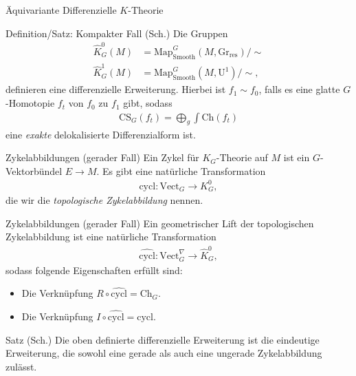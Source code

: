 \documentclass[12pt,utf8,notheorems,compress,t]{beamer}
\renewcommand{\_}{\mathpunct{.}}
\newcommand{\?}{\,{:}\,}
\newcommand{\Ch}{\mathrm{Ch}}
\newcommand{\CS}{\mathrm{CS}}
\newcommand{\grres}{\mathrm{Gr}_{\mathrm{res}}}
\begin{document}
\begin{frame}{Äquivariante Differenzielle $K$-Theorie}
    \begin{block}{Definition/Satz: Kompakter Fall (Sch.)}
        Die Gruppen
        \begin{align*}
            \hat K_G^0(M) &= \textrm{Map}^G_{\mathrm{Smooth}}(M, \grres)/\sim\\
            \hat K_G^{1}(M) &= \textrm{Map}^G_{\mathrm{Smooth}}(M, \mathrm
            U^1)/\sim,
        \end{align*}
        definieren eine differenzielle Erweiterung. Hierbei ist $f_1 \sim f_0$, 
        falls es eine glatte $G$-Homotopie $f_t$ von $f_0$ zu $f_1$ gibt, sodass
        \begin{align*}
            \CS_G(f_t) = \bigoplus_g \int \Ch(f_t) 
        \end{align*}
        eine \emph{exakte} delokalisierte Differenzialform ist.
    \end{block}
\end{frame}
\begin{frame}{Zykelabbildungen (gerader Fall)}
    Ein Zykel für $K_G$-Theorie auf $M$ ist ein $G$-Vektorbündel $E\to M$. Es
    gibt eine natürliche Transformation
    \begin{align*}
        \mathrm{cycl}\colon \mathrm{Vect}_G\to K_G^0,
    \end{align*}
    die wir die \emph{topologische Zykelabbildung} nennen.

\end{frame}
\begin{frame}{Zykelabbildungen (gerader Fall)}
    Ein geometrischer Lift der topologischen Zykelabbildung ist eine natürliche
    Transformation
    \begin{align*}
        \widehat{\mathrm{cycl}}\colon \mathrm{Vect}^{\nabla}_G\to \hat K_G^0,
    \end{align*}
    sodass folgende Eigenschaften erfüllt sind:
    \begin{itemize}
        \item<2-> Die Verknüpfung $R\circ \widehat{\mathrm{cycl}} =
            \mathrm{Ch}_G$.
        \item<2-> Die Verknüpfung $I\circ \widehat{\mathrm{cycl}} =
            \mathrm{cycl}$.
    \end{itemize}
\end{frame}
\begin{frame}
    \begin{block}{Satz (Sch.)}
        Die oben definierte differenzielle Erweiterung ist die eindeutige
        Erweiterung, die sowohl eine gerade als auch eine ungerade
        Zykelabbildung zulässt. 
    \end{block}
\end{frame}
\end{document}
